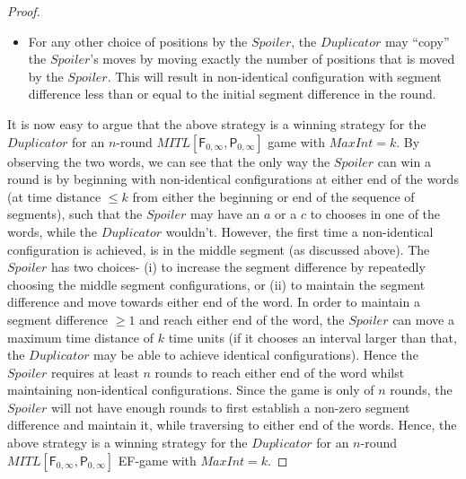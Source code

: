 \documentclass{llncs}
\newcommand{\fut}{\textsf{F}}
\newcommand{\past}{\textsf{P}}
\newcommand{\ssp}{\mbox{$\mathit{Spoiler}$}}
\newcommand{\ddp}{\mbox{$\mathit{Duplicator}$}}
\newcommand{\maxint}{\mbox{$\mathit{MaxInt}$}}
\newcommand{\mitlfpzinf}{\mbox{$\mathit{MITL[\fut_{0,\infty},\past_{0,\infty}]}$}}
\begin{document}
\begin{proof}
\begin{itemize}
\begin{itemize}
\item For any other choice of positions by the \ssp\/, the \ddp\/ may ``copy'' the \ssp\/'s moves by moving exactly the number of positions that is moved by the \ssp. This will result in non-identical configuration with segment difference less than or equal to the initial segment difference in the round.
\end{itemize}
\end{itemize}
It is now easy to argue that the above strategy is a winning strategy for the \ddp\/ for an $n$-round \mitlfpzinf\/ game with $\maxint=k$. By observing the two words, we can see that the only way the \ssp\/ can win a round is by beginning with non-identical configurations at either end of the words (at time distance $\leq k$ from either the beginning or end of the sequence of segments), such that the \ssp\/ may have an $a$ or a $c$ to chooses in one of the words, while the \ddp\/ wouldn't. However, the first time a non-identical configuration is achieved, is in the middle segment (as discussed above). The \ssp\/ has two choices- (i) to increase the segment difference by repeatedly choosing the middle segment configurations, or (ii) to maintain the segment difference and move towards either end of the word. In order to maintain a segment difference $\geq 1$ and reach either end of the word, the \ssp\/ can move a maximum time distance of $k$ time units (if it chooses an interval larger than that, the \ddp\/ may be able to achieve identical configurations). Hence the \ssp\/ requires at least $n$ rounds to reach either end of the word whilst maintaining non-identical configurations. Since the game is only of $n$ rounds, the \ssp\/ will not have enough rounds to first establish a non-zero segment difference and maintain it, while traversing to either end of the words. Hence, the above strategy is a winning strategy for the \ddp\/ for an $n$-round \mitlfpzinf\/ EF-game with $\maxint=k$.
\end{proof}
\end{document}
